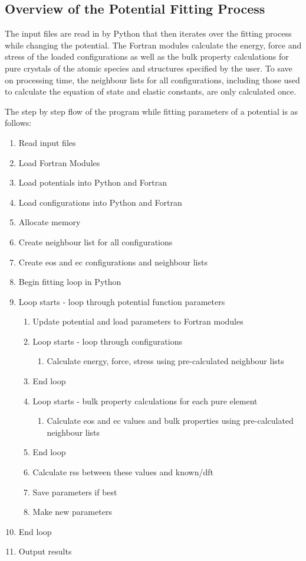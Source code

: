 \subsection{Overview of the Potential Fitting Process}

The input files are read in by Python that then iterates over the fitting process while changing the potential.  The Fortran modules calculate the energy, force and stress of the loaded configurations as well as the bulk property calculations for pure crystals of the atomic species and structures specified by the user.  To save on processing time, the neighbour lists for all configurations, including those used to calculate the equation of state and elastic constants, are only calculated once. 

The step by step flow of the program while fitting parameters of a potential is as follows:

\begin{enumerate}
\item Read input files
\item Load Fortran Modules
\item Load potentials into Python and Fortran
\item Load configurations into Python and Fortran
\item Allocate memory
\item Create neighbour list for all configurations
\item Create eos and ec configurations and neighbour lists
\item Begin fitting loop in Python
\item Loop starts - loop through potential function parameters
\begin{enumerate}
\item Update potential and load parameters to Fortran modules
\item Loop starts - loop through configurations
\begin{enumerate}
\item Calculate energy, force, stress using pre-calculated neighbour lists
\end{enumerate}
\item End loop
\item Loop starts - bulk property calculations for each pure element
\begin{enumerate}
\item Calculate eos and ec values and bulk properties using pre-calculated neighbour lists
\end{enumerate}
\item End loop
\item Calculate rss between these values and known/dft
\item Save parameters if best
\item Make new parameters
\end{enumerate}
\item End loop
\item Output results
\end{enumerate}

